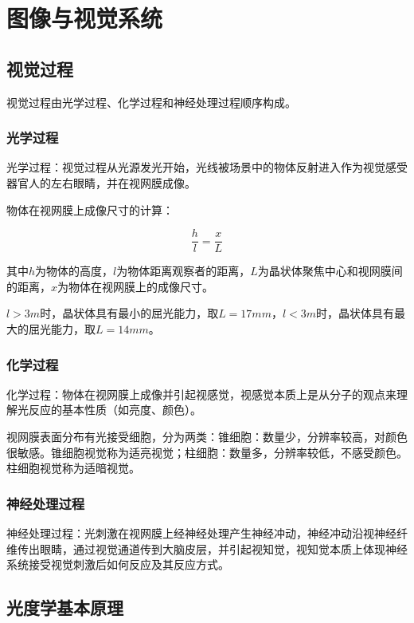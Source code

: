\documentclass[cn, blue, normal, 12pt]{elegantnote}
\begin{document}
\section{图像与视觉系统}

\subsection{视觉过程}

视觉过程由光学过程、化学过程和神经处理过程顺序构成。

\subsubsection{光学过程}

光学过程：视觉过程从光源发光开始，光线被场景中的物体反射进入作为视觉感受器官人的左右眼睛，并在视网膜成像。

物体在视网膜上成像尺寸的计算：

\begin{equation}
    \frac{h}{l}=\frac{x}{L}
\end{equation}

其中$h$为物体的高度，$l$为物体距离观察者的距离，$L$为晶状体聚焦中心和视网膜间的距离，$x$为物体在视网膜上的成像尺寸。

$l>3m$时，晶状体具有最小的屈光能力，取$L=17mm$，$l<3m$时，晶状体具有最大的屈光能力，取$L=14mm$。

\subsubsection{化学过程}

化学过程：物体在视网膜上成像并引起视感觉，视感觉本质上是从分子的观点来理解光反应的基本性质（如亮度、颜色）。

视网膜表面分布有光接受细胞，分为两类：锥细胞：数量少，分辨率较高，对颜色很敏感。锥细胞视觉称为适亮视觉；柱细胞：数量多，分辨率较低，不感受颜色。柱细胞视觉称为适暗视觉。

\subsubsection{神经处理过程}

神经处理过程：光刺激在视网膜上经神经处理产生神经冲动，神经冲动沿视神经纤维传出眼睛，通过视觉通道传到大脑皮层，并引起视知觉，视知觉本质上体现神经系统接受视觉刺激后如何反应及其反应方式。

\subsection{光度学基本原理}
\end{document}
